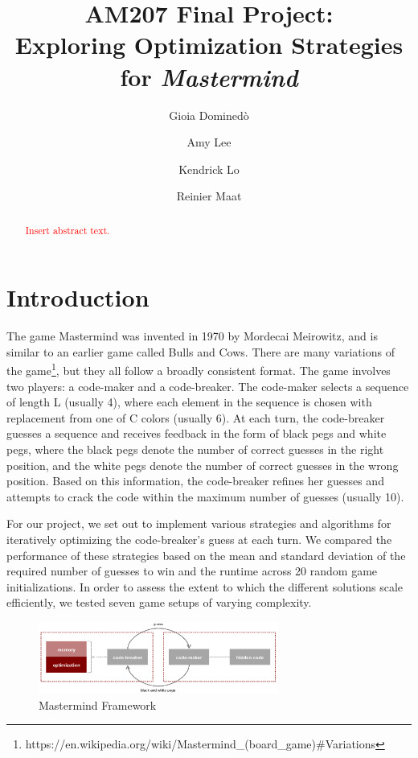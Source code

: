 \documentclass[11pt]{article}
\title{AM207 Final Project: \\ Exploring Optimization Strategies for \textit{Mastermind}}
\author{Gioia Domined\`o \and Amy Lee \and Kendrick Lo \and Reinier Maat}
\begin{document}
\maketitle{}

\begin{abstract}
\textcolor{red}{Insert abstract text.}
\end{abstract}

\pagestyle{plain}

\section{Introduction}

The game Mastermind was invented in 1970 by Mordecai Meirowitz, and is similar to an earlier game called Bulls and Cows. There are many variations of the game\footnote{https://en.wikipedia.org/wiki/Mastermind\_(board\_game)\#Variations}, but they all follow a broadly consistent format. The game involves two players: a code-maker and a code-breaker. The code-maker selects a sequence of length L (usually 4), where each element in the sequence is chosen with replacement from one of C colors (usually 6). At each turn, the code-breaker guesses a sequence and receives feedback in the form of black pegs and white pegs, where the black pegs denote the number of correct guesses in the right position, and the white pegs denote the number of correct guesses in the wrong position. Based on this information, the code-breaker refines her guesses and attempts to crack the code within the maximum number of guesses (usually 10).

For our project, we set out to implement various strategies and algorithms for iteratively optimizing the code-breaker's guess at each turn. We compared the performance of these strategies based on the mean and standard deviation of the required number of guesses to win and the runtime across 20 random game initializations. In order to assess the extent to which the different solutions scale efficiently, we tested seven game setups of varying complexity.

\begin{figure}[!htbp]
\centering
\includegraphics[width=0.7\textwidth]{img/game_setup}
\caption{Mastermind Framework}
\label{fig:game_setup}
\end{figure}
\end{document}
